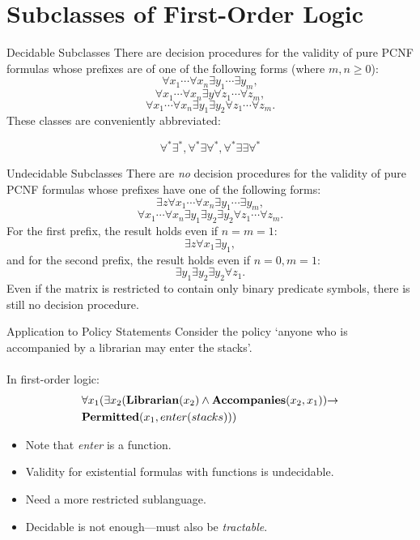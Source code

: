 \documentclass[style=sailor,size=12pt,mode=present]{powerdot}
\newcommand{\bid}[1]{\mbox{\bf #1}}
\theoremstyle{definition}
\newenvironment{ex}[1]
  {\renewcommand\theinnerexample{#1}\innerexample}
  {\endinnerexample}
\newenvironment{thm}[1]
  {\renewcommand\theinnerthm{#1}\innerthm}
  {\endinnerthm}
\begin{document}
\section[slide=false]{Subclasses of First-Order Logic}
\begin{slide}[bm=,toc=]{Decidable Subclasses}
\begin{thm}{12.5}
There are decision procedures for the validity of pure PCNF formulas whose
prefixes are of one of the following forms (where $m,n \geq 0$):
\[ \forall x_1\cdots \forall x_n \exists y_1 \cdots \exists y_m, \]
\[ \forall x_1\cdots \forall x_n \exists y \forall z_1 \cdots \forall z_m, \]
\[ \forall x_1\cdots \forall x_n \exists y_1 \exists y_2 \forall z_1 \cdots \forall z_m. \]
These classes are conveniently abbreviated: 

\[    \forall^*\exists^*, \forall^*\exists \forall^*,   \forall^*\exists \exists \forall^*\]
\end{thm}
\end{slide}

\begin{wideslide}[bm=,toc=]{Undecidable Subclasses}
\begin{thm}{12.6}
There are \emph{no} decision procedures for the validity of pure PCNF formulas whose
prefixes have one of the following forms:
\[ \exists z \forall x_1\cdots \forall x_n \exists y_1 \cdots \exists y_m, \]
\[ \forall x_1\cdots \forall x_n \exists y_1 \exists y_2 \exists y_2 \forall z_1 \cdots \forall z_m. \]
For the first prefix, the result holds even if $n = m = 1$:
\[ \exists z \forall x_1 \exists y_1, \]
and for the second prefix, the result holds even if $n = 0, m = 1$:
\[ \exists y_1 \exists y_2 \exists y_2 \forall z_1. \]
Even if the matrix is restricted to contain only binary predicate symbols, there
is still no decision procedure.
\end{thm}
\end{wideslide}

\begin{wideslide}[bm=,toc=]{Application to Policy Statements}
\begin{ex}{3.2}[Halpern and Weissman]
Consider the policy `anyone who is accompanied by a librarian
may enter the stacks'.\\~\\
In first-order logic:
\begin{align*}
& \forall x_1 (\exists x_2 (\bid{Librarian}(x_2) \land \bid{Accompanies}(x_2,x_1)) \imp \\
& \bid{Permitted}(x_1, enter(stacks)))
\end{align*}
\end{ex}
\begin{itemize} 
\item Note that \emph{enter} is a function.
\item Validity for existential formulas with functions is undecidable. 
\item Need a more restricted sublanguage.
\item Decidable is not enough---must also be \emph{tractable}.
\end{itemize}
\end{wideslide}
\end{document}
